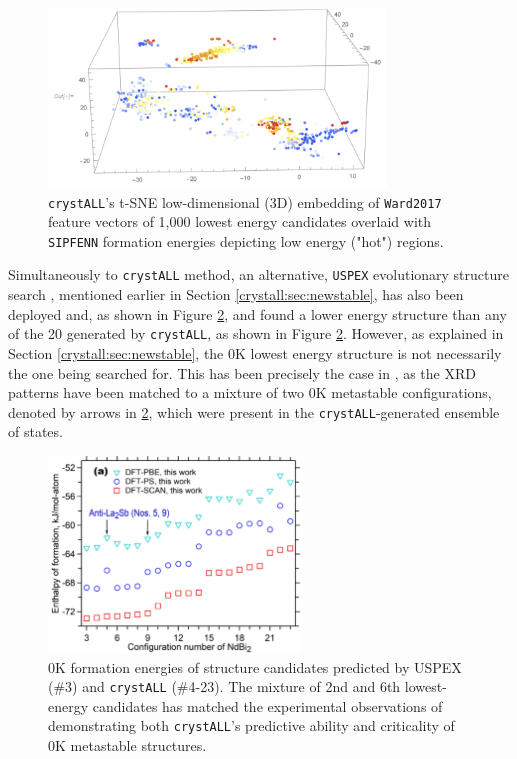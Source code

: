 \begin{figure}[H]
    \centering
    \includegraphics[width=0.8\textwidth]{crystall/crystall_NdBi2_energies.png}
    \caption{\texttt{crystALL}'s t-SNE low-dimensional (3D) embedding of \texttt{Ward2017} feature vectors of 1,000 lowest energy  candidates overlaid with \texttt{SIPFENN} formation energies depicting low energy ("hot") regions.}
    \label{crystall:fig:ndbi2energies}
\end{figure}


Simultaneously to \texttt{crystALL} method, an alternative, \texttt{USPEX} evolutionary structure search \cite{Lyakhov2013NewUSPEX}, mentioned earlier in Section \ref{crystall:sec:newstable}, has also been deployed and, as shown in Figure \ref{crystall:fig:ndbi2dft}, and found a lower energy structure than any of the 20 generated by \texttt{crystALL}, as shown in Figure \ref{crystall:fig:ndbi2dft}. However, as explained in Section \ref{crystall:sec:newstable}, the 0K lowest energy structure is not necessarily the one being searched for. This has been precisely the case in \citet{Im2022ThermodynamicModeling}, as the XRD patterns have been matched to a mixture of two 0K metastable configurations, denoted by arrows in \ref{crystall:fig:ndbi2dft}, which were present in the \texttt{crystALL}-generated ensemble of states.

\begin{figure}[H]
    \centering
    \includegraphics[width=0.6\textwidth]{crystall/crystall_NdBi2dft.jpg}
    \caption{0K formation energies of structure candidates predicted by USPEX (\#3) and \texttt{crystALL} (\#4-23). The mixture of 2nd and 6th lowest-energy candidates has matched the experimental observations of  demonstrating both \texttt{crystALL}'s predictive ability and criticality of 0K metastable structures.}
    \label{crystall:fig:ndbi2dft}
\end{figure}


